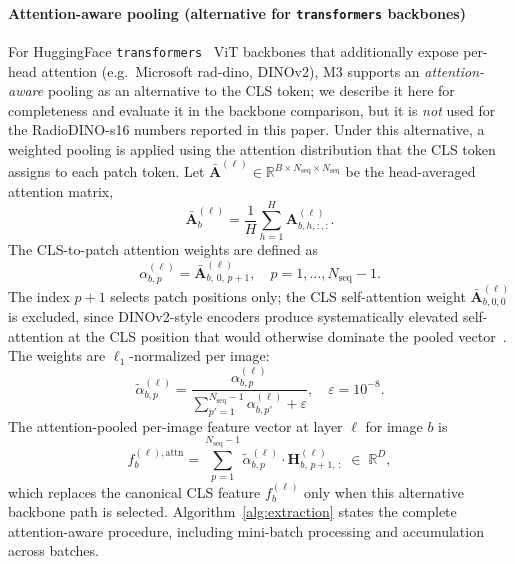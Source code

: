 \documentclass[lettersize,journal]{IEEEtran}
\begin{document}
\paragraph{Attention-aware pooling (alternative for \texttt{transformers} backbones)}
For HuggingFace \texttt{transformers}~\cite{wolf2020transformers} ViT backbones that additionally expose
per-head attention (e.g.\ Microsoft rad-dino, DINOv2), M3 supports an
\emph{attention-aware} pooling as an alternative to the CLS token; we describe
it here for completeness and evaluate it in the backbone comparison, but it is
\emph{not} used for the RadioDINO-s16 numbers reported in this paper.
Under this alternative, a weighted pooling is applied using the attention
distribution that the CLS token assigns to each patch token.
Let $\bar{\mathbf{A}}^{(\ell)} \in \mathbb{R}^{B \times N_\text{seq}
\times N_\text{seq}}$ be the head-averaged attention matrix,
\begin{equation}
  \bar{\mathbf{A}}^{(\ell)}_{b} =
  \frac{1}{H} \sum_{h=1}^{H} \mathbf{A}^{(\ell)}_{b,h,:,:}.
\end{equation}
The CLS-to-patch attention weights are defined as
\begin{equation}
  \label{eq:cls_attn}
  \alpha^{(\ell)}_{b,p} = \bar{\mathbf{A}}^{(\ell)}_{b,\, 0,\, p+1},
  \quad p = 1, \ldots, N_\text{seq}-1.
\end{equation}
The index $p+1$ selects patch positions only; the CLS self-attention
weight $\bar{\mathbf{A}}^{(\ell)}_{b,0,0}$ is excluded, since
DINOv2-style encoders produce systematically elevated self-attention at
the CLS position that would otherwise dominate the pooled
vector~\cite{darcet2023registers}.
The weights are $\ell_1$-normalized per image:
\begin{equation}
  \label{eq:attn_norm}
  \tilde{\alpha}^{(\ell)}_{b,p} =
  \frac{\alpha^{(\ell)}_{b,p}}
       {\displaystyle\sum_{p'=1}^{N_\text{seq}-1}
        \alpha^{(\ell)}_{b,p'} + \varepsilon},
  \quad \varepsilon = 10^{-8}.
\end{equation}
The attention-pooled per-image feature vector at layer $\ell$ for image $b$ is
\begin{equation}
  \label{eq:pooling}
  f^{(\ell),\mathrm{attn}}_b =
  \sum_{p=1}^{N_\text{seq}-1}
  \tilde{\alpha}^{(\ell)}_{b,p} \cdot
  \mathbf{H}^{(\ell)}_{b,\, p+1,\, :}
  \;\in\; \mathbb{R}^{D},
\end{equation}
which replaces the canonical CLS feature $f^{(\ell)}_b$ only when this
alternative backbone path is selected.
Algorithm~\ref{alg:extraction} states the complete attention-aware procedure,
including mini-batch processing and accumulation across batches.
\end{document}
